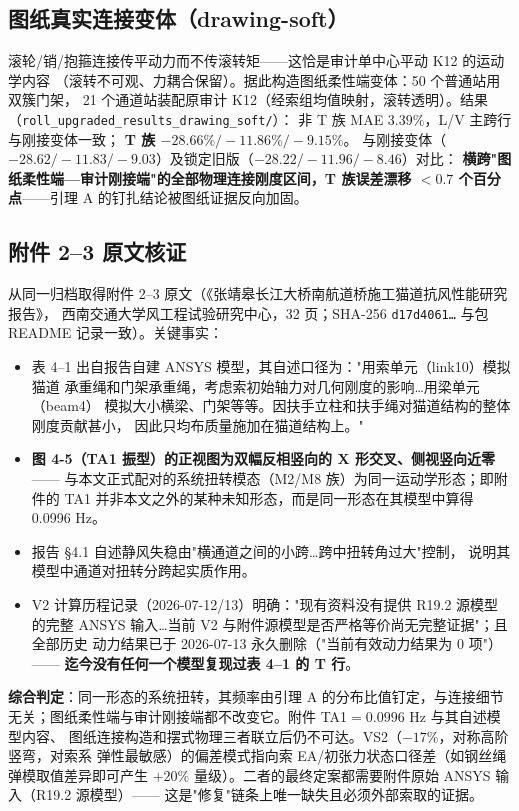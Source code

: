 \documentclass[11pt,a4paper]{ctexart}
\begin{document}
\subsection{图纸真实连接变体（drawing-soft）}

滚轮/销/抱箍连接传平动力而不传滚转矩——这恰是审计单中心平动 K12 的运动学内容
（滚转不可观、力耦合保留）。据此构造图纸柔性端变体：50 个普通站用双簇门架，
21 个通道站装配原审计 K12（经索组均值映射，滚转透明）。结果（\texttt{roll\_upgraded\_results\_drawing\_soft/}）：
非 T 族 MAE $3.39\%$，L/V 主跨行与刚接变体一致；
\textbf{T 族 $-28.66\%/-11.86\%/-9.15\%$}。
与刚接变体（$-28.62/-11.83/-9.03$）及锁定旧版（$-28.22/-11.96/-8.46$）对比：
\textbf{横跨"图纸柔性端—审计刚接端"的全部物理连接刚度区间，T 族误差漂移
$<0.7$ 个百分点}——引理 A 的钉扎结论被图纸证据反向加固。

\subsection{附件 2--3 原文核证}

从同一归档取得附件 2--3 原文（《张靖皋长江大桥南航道桥施工猫道抗风性能研究报告》，
西南交通大学风工程试验研究中心，32 页；SHA-256 \texttt{d17d4061\ldots} 与包 README
记录一致）。关键事实：

\begin{itemize}
  \item 表 4--1 出自报告自建 ANSYS 模型，其自述口径为："用索单元（link10）模拟猫道
        承重绳和门架承重绳，考虑索初始轴力对几何刚度的影响\ldots 用梁单元（beam4）
        模拟大小横梁、门架等等。因扶手立柱和扶手绳对猫道结构的整体刚度贡献甚小，
        因此只均布质量施加在猫道结构上。"
  \item \textbf{图 4-5（TA1 振型）的正视图为双幅反相竖向的 X 形交叉、侧视竖向近零}——
        与本文正式配对的系统扭转模态（M2/M8 族）为同一运动学形态；即附件的 TA1
        并非本文之外的某种未知形态，而是同一形态在其模型中算得 0.0996 Hz。
  \item 报告 §4.1 自述静风失稳由"横通道之间的小跨\ldots 跨中扭转角过大"控制，
        说明其模型中通道对扭转分跨起实质作用。
  \item V2 计算历程记录（2026-07-12/13）明确："现有资料没有提供 R19.2 源模型的完整
        ANSYS 输入\ldots 当前 V2 与附件源模型是否严格等价尚无完整证据"；且全部历史
        动力结果已于 2026-07-13 永久删除（"当前有效动力结果为 0 项"）——
        \textbf{迄今没有任何一个模型复现过表 4--1 的 T 行}。
\end{itemize}

\textbf{综合判定}：同一形态的系统扭转，其频率由引理 A 的分布比值钉定，与连接细节
无关；图纸柔性端与审计刚接端都不改变它。附件 TA1$=0.0996$ Hz 与其自述模型内容、
图纸连接构造和摆式物理三者联立后仍不可达。VS2（$-17\%$，对称高阶竖弯，对索系
弹性最敏感）的偏差模式指向索 EA/初张力状态口径差（如钢丝绳弹模取值差异即可产生
$+20\%$ 量级）。二者的最终定案都需要附件原始 ANSYS 输入（R19.2 源模型）——
这是"修复"链条上唯一缺失且必须外部索取的证据。
\end{document}
